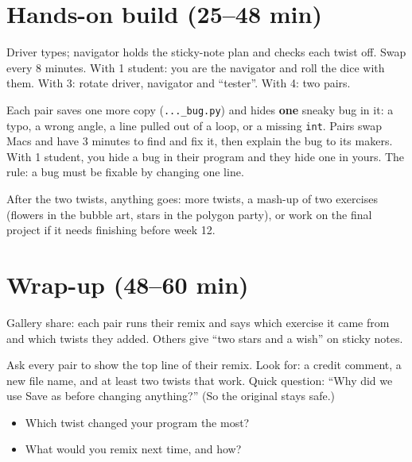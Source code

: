 \section{Hands-on build (25--48 min)}
\begin{pairroles}
Driver types; navigator holds the sticky-note plan and checks each twist off. Swap every 8 minutes. With 1 student: you are the navigator and roll the dice with them. With 3: rotate driver, navigator and \enquote{tester}. With 4: two pairs.
\end{pairroles}
\begin{bughunt}
Each pair saves one more copy (\texttt{...\_bug.py}) and hides \textbf{one} sneaky bug in it: a typo, a wrong angle, a line pulled out of a loop, or a missing \texttt{int}. Pairs swap Macs and have 3 minutes to find and fix it, then explain the bug to its makers. With 1 student, you hide a bug in their program and they hide one in yours. The rule: a bug must be fixable by changing one line.
\end{bughunt}
\begin{freebuild}
After the two twists, anything goes: more twists, a mash-up of two exercises (flowers in the bubble art, stars in the polygon party), or work on the final project if it needs finishing before week 12.
\end{freebuild}

\section{Wrap-up (48--60 min)}
Gallery share: each pair runs their remix and says which exercise it came from and which twists they added. Others give \enquote{two stars and a wish} on sticky notes.
\begin{formativecheck}
Ask every pair to show the top line of their remix. Look for: a credit comment, a new file name, and at least two twists that work. Quick question: \enquote{Why did we use Save as before changing anything?} (So the original stays safe.)
\end{formativecheck}
\begin{reflection}
\begin{itemize}[leftmargin=1.2em,itemsep=1pt]
  \item Which twist changed your program the most?
  \item What would you remix next time, and how?
\end{itemize}
\end{reflection}

